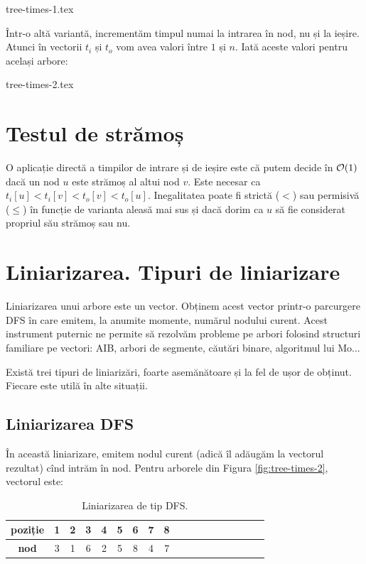 \documentclass[../main.tex]{subfiles}
\begin{document}
{tree-times-1.tex}

Într-o altă variantă, incrementăm timpul numai la intrarea în nod, nu și la ieșire. Atunci în vectorii $t_i$ și $t_o$ vom avea valori între $1$ și $n$. Iată aceste valori pentru același arbore:

{tree-times-2.tex}

\section{Testul de strămoș}

O aplicație directă a timpilor de intrare și de ieșire este că putem decide în $\mathcal{O}(1)$ dacă un nod $u$ este strămoș al altui nod $v$. Este necesar ca $t_i[u] < t_i[v] < t_o[v] < t_o[u]$. Inegalitatea poate fi strictă ($<$) sau permisivă ($\leq$) în funcție de varianta aleasă mai sus și dacă dorim ca $u$ să fie considerat propriul său strămoș sau nu.

\section{Liniarizarea. Tipuri de liniarizare}
\label{sec:linearization-types}

Liniarizarea unui arbore este un vector. Obținem acest vector printr-o parcurgere DFS în care emitem, la anumite momente, numărul nodului curent. Acest instrument puternic ne permite să rezolvăm probleme pe arbori folosind structuri familiare pe vectori: AIB, arbori de segmente, căutări binare, algoritmul lui Mo...

Există trei tipuri de liniarizări, foarte asemănătoare și la fel de ușor de obținut. Fiecare este utilă în alte situații.

\subsection{Liniarizarea DFS}

În această liniarizare, emitem nodul curent (adică îl adăugăm la vectorul rezultat) cînd intrăm în nod. Pentru arborele din Figura \ref{fig:tree-times-2}, vectorul este:

\begin{table}[!htbp]
  \centering
  \begin{tabular}{ScScScScScScScScSc}
    \textbf{poziție} & 1 & 2 & 3 & 4 & 5 & 6 & 7 & 8 \\
    \hline
    \textbf{nod} & 3 & 1 & 6 & 2 & 5 & 8 & 4 & 7 \\
  \end{tabular}

  \caption{Liniarizarea de tip DFS.}
\end{table}
\end{document}
